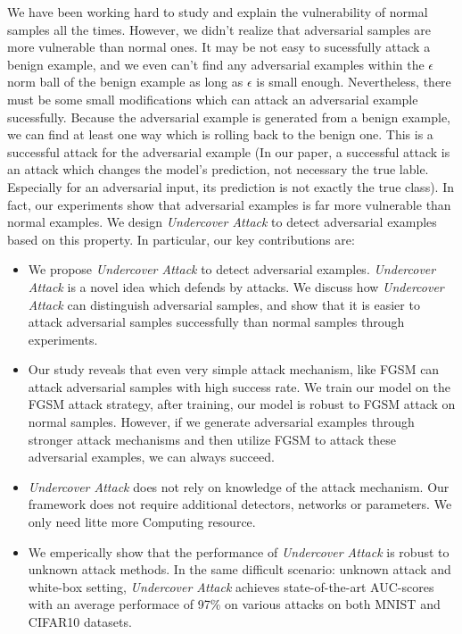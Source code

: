 \documentclass{article}
\begin{document}
We have been working hard to study and explain the vulnerability of normal samples all the times. However, we didn't realize that adversarial samples are more vulnerable than normal ones. It may be not easy to sucessfully attack a benign example, and we even can't find any adversarial examples within the $\epsilon$ norm ball of the benign example as long as $\epsilon$ is small enough. Nevertheless, there must be some small modifications which can attack an adversarial example sucessfully. Because the adversarial example is generated from a benign example, we can find at least one way which is rolling back to the benign one. This is a successful attack for the adversarial example (In our paper, a successful attack is an attack which changes the model's prediction, not necessary the true lable. Especially for an adversarial input, its prediction is not exactly the true class). In fact, our experiments show that adversarial examples is far more vulnerable than normal examples. We design \emph{Undercover Attack} to detect adversarial examples based on this property. In particular, our key contributions are:

\begin{itemize}

  \item We propose \emph{Undercover Attack} to detect adversarial examples. \emph{Undercover Attack} is a novel idea which defends by attacks. We discuss how \emph{Undercover Attack} can distinguish adversarial samples, and show that it is easier to attack adversarial samples successfully than normal samples through experiments. 

  \item Our study reveals that even very simple attack mechanism, like FGSM can attack adversarial samples with high success rate.  We train our model on the FGSM attack strategy, after training, our model is robust to FGSM attack on normal samples. However, if we generate adversarial examples through stronger attack mechanisms and then utilize FGSM to attack these adversarial examples, we can always succeed.

  \item \emph{Undercover Attack} does not rely on knowledge of the attack mechanism. Our framework does not require additional detectors, networks or parameters. We only need litte more Computing resource.

  \item We emperically show that the performance of \emph{Undercover Attack} is robust to unknown attack methods. In the same difficult scenario: unknown attack and white-box setting, \emph{Undercover Attack} achieves state-of-the-art AUC-scores with an average performace of 97\% on various attacks on both MNIST and CIFAR10 datasets.

\end{itemize}
\end{document}

